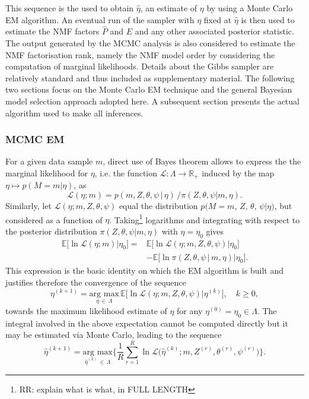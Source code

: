 \documentclass{bioinfo}
\begin{document}
This sequence is the used to obtain $\hat\eta$, an estimate of
$\eta$ by using a Monte Carlo EM algorithm. An eventual run of the
sampler with $\eta$ fixed at $\hat\eta$ is then used to estimate the
NMF factors $\widehat P$ and $\widehat E$ and any other associated
posterior statistic. The output generated by the MCMC analysis is also
considered to estimate the NMF factorisation rank, namely the NMF
model order by considering the computation of marginal
likelihoods. Details about the Gibbs sampler are relatively standard
and thus included as supplementary material. The following two
sections focus on the Monte Carlo EM technique and the general
Bayesian model selection approach adopted here. A subsequent section
presents the actual algorithm used to make all inferences.

\subsubsection{MCMC EM}\label{sec:MCMCEM}
For a given data sample $m$, direct use of Bayes theorem
allows to  express the the marginal likelihood for $\eta$, i.e. the
function $\mathcal L: \Lambda \to \mathbb R_+$ induced by the map $\eta 
\mapsto p(M=m|\eta)$, as
\begin{equation}
  \label{eqn:margLik}
  \mathcal L(\eta; m) 
  = p(m, Z, \theta, \psi\,|\,\eta)\,\big/\pi(Z,
      \theta, \psi|m, \eta).
\end{equation}
Similarly, let $\mathcal L(\eta; m, Z, \theta, \psi)$ equal the
distribution $p(M=m$, $Z$, $\theta$, $\psi|\eta)$, but considered as a
function of $\eta$. Taking\footnote{RR: explain what is what, in FULL
  LENGTH} logarithms and integrating with respect to the posterior  distribution  $\pi(Z,  \theta, \psi|m,  \eta)$ with $\eta = \eta_0$ gives 
\begin{align*}
   \mathbb E\big[\ln\mathcal L(\eta; m) \big| \eta_0\big] 
  =& 
  \mathbb E\big[\ln\mathcal L(\eta; m, Z, \theta, \psi)
    \big|  \eta_0\big]\\ 
  &-
  \mathbb E\big[\ln \pi(Z, \theta, \psi\,|\,m,\eta)\big| \eta_0\big].
\end{align*}  
This expression is the basic identity on which the EM algorithm is
built and justifies therefore the convergence of the sequence
\begin{equation}
 \label{eqn:EofMCEM}
  \eta^{(k+1)} = \underset{\eta\,\in\, \Lambda}{\text{arg max}}\, 
  \mathbb E\Big[\ln\mathcal L(\eta; m, Z, \theta, \psi)\big|
  \eta^{(k)}\Big], 
  \quad k\geqslant 0,
\end{equation}
towards the maximum likelihood estimate of $\eta$ for any $\eta^{(0)}
= \eta_0  \in \Lambda$. The integral involved in the above expectation
cannot be computed directly but it may be estimated via Monte Carlo,
leading to the sequence 
\begin{equation}
 \label{eqn:MCEM}
   \hat\eta^{(k+1)}
 = 
    \underset{\hat\eta^{(k)}\,\in\,\Lambda}{\text{arg max}} 
   \bigg\{
    \frac{1}{R}\sum_{r=1}^R 
      \ln\mathcal L\Big(\hat\eta^{(k)}; m, Z^{(r)}, \theta^{(r)},
      \psi^{(r)}\Big)
   \bigg\}.
\end{equation}
\end{document}
